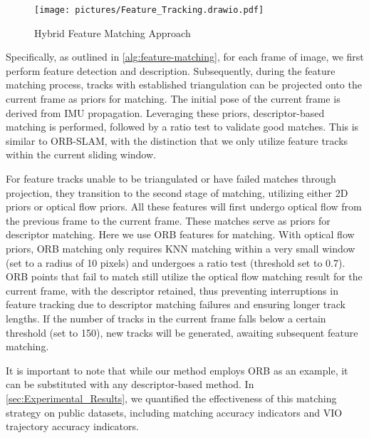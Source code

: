 
\begin{figure}[h]
    \centering
    \texttt{[image: pictures/Feature\_Tracking.drawio.pdf]}
    \caption{Hybrid Feature Matching Approach}
    \label{fig:Feature—Tracking}
\end{figure}
Specifically, as outlined in \cref{alg:feature-matching}, for each frame of image, we first perform feature detection and description. Subsequently, during the feature matching process, tracks with established triangulation can be projected onto the current frame as priors for matching. The initial pose of the current frame is derived from IMU propagation. Leveraging these priors, descriptor-based matching is performed, followed by a ratio test to validate good matches. This is similar to ORB-SLAM\cite{murartal-tro-2015-ORB-SLAM}, with the distinction that we only utilize feature tracks within the current sliding window.

For feature tracks unable to be triangulated or have failed matches through projection, they transition to the second stage of matching, utilizing either 2D priors or optical flow priors. All these features will first undergo optical flow \cite{Lucas_Kanade_1981_KLT} from the previous frame to the current frame. These matches serve as priors for descriptor matching. Here we use ORB features for matching. With optical flow priors, ORB matching only requires KNN matching within a very small window (set to a radius of 10 pixels) and undergoes a ratio test (threshold set to 0.7). ORB points that fail to match still utilize the optical flow matching result for the current frame, with the descriptor retained, thus preventing interruptions in feature tracking due to descriptor matching failures and ensuring longer track lengths. If the number of tracks in the current frame falls below a certain threshold (set to 150), new tracks will be generated, awaiting subsequent feature matching.

It is important to note that while our method employs ORB as an example, it can be substituted with any descriptor-based method.
In \cref{sec:Experimental_Results}, we quantified the effectiveness of this matching strategy on public datasets, including matching accuracy indicators and VIO trajectory accuracy indicators.

